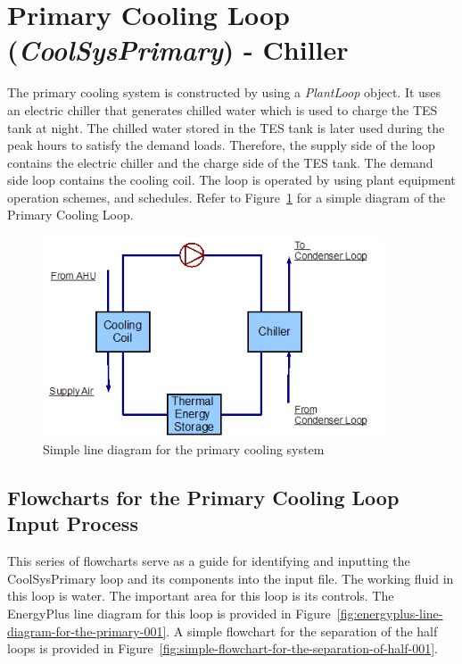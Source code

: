 \section{\texorpdfstring{Primary Cooling Loop (\emph{CoolSysPrimary}) - Chiller}{Primary Cooling Loop (CoolSysPrimary) - Chiller}}\label{primary-cooling-loop-coolsysprimary---chiller}

The primary cooling system is constructed by using a \emph{PlantLoop} object. It uses an electric chiller that generates chilled water which is used to charge the TES tank at night. The chilled water stored in the TES tank is later used during the peak hours to satisfy the demand loads. Therefore, the supply side of the loop contains the electric chiller and the charge side of the TES tank. The demand side loop contains the cooling coil. The loop is operated by using plant equipment operation schemes, and schedules. Refer to Figure~\ref{fig:simple-line-diagram-for-the-primary-cooling} for a simple diagram of the Primary Cooling Loop.

\begin{figure}[hbtp] %
\centering
\includegraphics[width=0.9\textwidth, height=0.9\textheight, keepaspectratio=true]{media/image046.png}
\caption{Simple line diagram for the primary cooling system \protect \label{fig:simple-line-diagram-for-the-primary-cooling}}
\end{figure}

\subsection{Flowcharts for the Primary Cooling Loop Input Process}\label{flowcharts-for-the-primary-cooling-loop-input-process}

This series of flowcharts serve as a guide for identifying and inputting the CoolSysPrimary loop and its components into the input file. The working fluid in this loop is water. The important area for this loop is its controls. The EnergyPlus line diagram for this loop is provided in Figure~\ref{fig:energyplus-line-diagram-for-the-primary-001}. A simple flowchart for the separation of the half loops is provided in Figure~\ref{fig:simple-flowchart-for-the-separation-of-half-001}.

